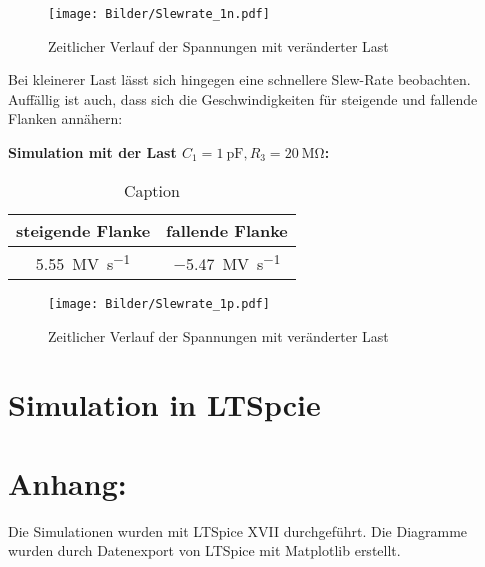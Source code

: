 \begin{figure}[H]
    \centering
    \texttt{[image: Bilder/Slewrate\_1n.pdf]}
    \caption{Zeitlicher Verlauf der Spannungen mit veränderter Last}
\end{figure}

Bei kleinerer Last lässt sich hingegen eine schnellere Slew-Rate beobachten. Auffällig ist auch, dass sich die Geschwindigkeiten für steigende und fallende Flanken annähern:

\textbf{Simulation mit der Last $C_1 = \SI{1}{\pico \farad}, R_3 = \SI{20}{\mega \ohm}$:}

\begin{table}[H]
    \centering
    \begin{tabular}{|c|c|}
    \hline
         steigende Flanke & fallende Flanke  \\ \hline
         \SI{5.55}{\mega \volt \per \second} & \SI{-5.47}{\mega \volt \per \second} \\ \hline
    \end{tabular}
    \caption{Caption}
    \label{tab:my_label}
\end{table}

\begin{figure}[H]
    \centering
    \texttt{[image: Bilder/Slewrate\_1p.pdf]}
    \caption{Zeitlicher Verlauf der Spannungen mit veränderter Last}
\end{figure}

\section{Simulation in LTSpcie}

\section{Anhang:}

Die Simulationen wurden mit LTSpice XVII durchgeführt. Die Diagramme wurden durch Datenexport von LTSpice mit Matplotlib erstellt.